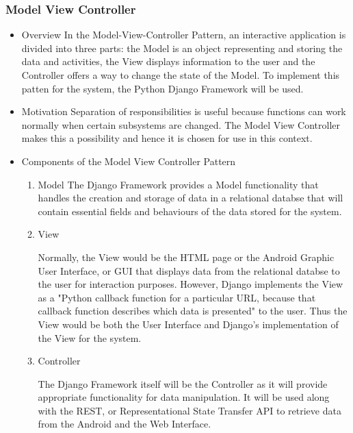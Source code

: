 \documentclass[a4paper,12pt]{article}
\begin{document}
\subsubsection{Model View Controller}
\begin{itemize}
\item{Overview}
\newline
In the Model-View-Controller Pattern, an interactive application is divided into three parts: the Model is an object representing and storing the data and activities, the View displays information to the user and the Controller offers a way to change the state of the Model. To implement this patten for the system, the Python Django Framework will be used.

\item{Motivation}
\newline
Separation of responsibilities is useful because functions can work normally when certain subsystems are changed. The Model View Controller makes this a possibility and hence it is chosen for use in this context. 

\item{Components of the Model View Controller Pattern}
\begin{enumerate}
\item{Model}
\newline
The Django Framework provides a Model functionality that handles the creation and storage of data in a relational databse that will contain essential fields and behaviours of the data stored for the system.
\newline

\item{View}

Normally, the View would be the HTML page or the Android Graphic User Interface, or GUI that displays data from the relational databse to the user for interaction purposes. However, Django implements the View as a "Python callback function for a particular  URL, because that callback function describes which data is presented" to the user. Thus the View would be both the User Interface and Django's  implementation of the View for the system.
\newline
\item{Controller}

The Django Framework itself will be the Controller as it will provide appropriate functionality for data manipulation. It will be used along with the REST, or Representational State Transfer API to retrieve data from the Android and the Web Interface.

\end{enumerate}
\end{itemize}
\end{document}
